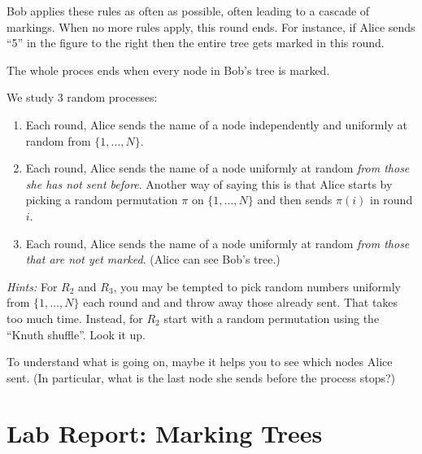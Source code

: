 \documentclass{tufte-handout}
\begin{document}
Bob applies these rules as often as possible, often leading to a
cascade of markings.
When no more rules apply, this round ends. 
For instance, if Alice sends ``5'' in the figure to the right then the
entire tree gets marked in this round.
\begin{marginfigure}
\end{marginfigure}
The whole proces ends when
every node in Bob's tree is marked.



We study 3 random processes:
\begin{enumerate}
\item Each round, Alice sends the name of a node independently and
  uniformly at random from $\{1,\ldots, N\}$.
\item Each round, Alice sends the name of a node uniformly at
  random \emph{from those she has not sent before}.
  Another way of saying this is that Alice starts by picking a random
  permutation $\pi$ on $\{1,\ldots, N\}$ and then sends $\pi(i)$ in
  round $i$.
\item Each round, Alice sends the name of a node uniformly at random
  \emph{from those that are not yet marked}. (Alice can see Bob's tree.)
\end{enumerate}


\emph{Hints:} For $R_2$ and $R_3$, you may be tempted to pick random
numbers uniformly from $\{1,\ldots,N\}$ each round and and throw away
those already sent. That takes too much time.
Instead, for $R_2$ start with a random permutation using the ``Knuth
shuffle''.
Look it up.

To understand what is going on, maybe it helps you to see which nodes
Alice sent. (In particular, what is the last node she sends before the
process stops?)



\newpage
\section{Lab Report: Marking Trees}
\end{document}
